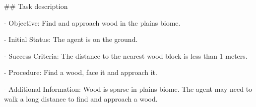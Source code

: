 

\#\# Task description

- Objective: Find and approach wood in the plains biome.

- Initial Status: The agent is on the ground.

- Success Criteria: The distance to the nearest wood block is less than 1 meters.

- Procedure: Find a wood, face it and approach it.

- Additional Information: Wood is sparse in plains biome. The agent may need to walk a long distance to find and approach a wood.



